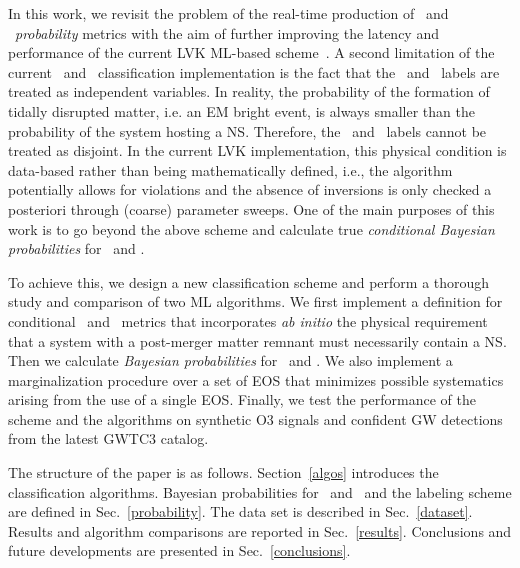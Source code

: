 In this work, we revisit the problem of the real-time production of \hasns\ and \hasrem\ \emph{probability} metrics with the aim of further improving the latency and performance of the
current \ac{LVK} \ac{ML}-based scheme~\cite{Chatterjee:2019avs}.  A second limitation of the current
\hasns\ and \hasrem\ classification implementation is the fact that the \hasns\ and \hasrem\ labels are treated as independent variables. In reality, the probability of the formation of
tidally disrupted matter, i.e. an \ac{EM} bright event, is always smaller than the probability of the system hosting a \ac{NS}. Therefore, the \hasns\ and \hasrem\ labels cannot be
treated as disjoint. In the current \ac{LVK} implementation, this physical condition is data-based rather than being mathematically defined, i.e., the algorithm potentially allows for
violations and the absence of inversions is only checked a posteriori through (coarse) parameter sweeps. One of the main purposes of this work is to go beyond the above scheme and
calculate true \emph{conditional Bayesian probabilities} for \hasns\ and \hasrem. 

To achieve this, we design a new classification scheme and perform a thorough study and comparison of two \ac{ML} algorithms. We first implement a definition for conditional \hasns\ and
\hasrem\ metrics that incorporates \emph{ab initio} the physical requirement that a system with a post-merger matter remnant must necessarily contain a \ac{NS}. Then we calculate
\emph{Bayesian probabilities} for \hasns\ and \hasrem. We also implement a marginalization procedure over a set of \ac{EOS} that minimizes possible systematics arising from the use of a
single \ac{EOS}. Finally, we test the performance of the scheme and the algorithms on synthetic \ac{O3} signals and confident \ac{GW} detections from the latest \ac{GWTC3} catalog.

The structure of the paper is as follows. Section~\ref{algos} introduces the classification algorithms. Bayesian probabilities for \hasns\ and \hasrem\ and the labeling scheme are defined
in Sec.~\ref{probability}. The data set is described in Sec.~\ref{dataset}. Results and algorithm comparisons are reported in Sec.~\ref{results}. Conclusions and future developments are
presented in Sec.~\ref{conclusions}.  
